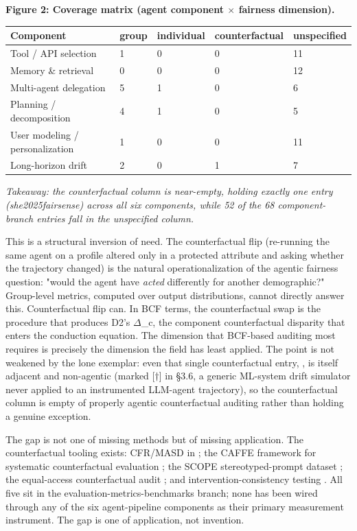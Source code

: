 \documentclass[10pt]{article}
\begin{document}
\textbf{Figure 2: Coverage matrix (agent component $\times$ fairness dimension).}

\begin{center}\footnotesize
\begin{longtable}{|p{}|p{}|p{}|p{}|p{}|}
\hline \textbf{Component} & \textbf{group} & \textbf{individual} & \textbf{counterfactual} & \textbf{unspecified} \\ \hline\endhead
Tool / API selection & 1 & 0 & 0 & 11 \\ \hline
Memory \& retrieval & 0 & 0 & 0 & 12 \\ \hline
Multi-agent delegation & 5 & 1 & 0 & 6 \\ \hline
Planning / decomposition & 4 & 1 & 0 & 5 \\ \hline
User modeling / personalization & 1 & 0 & 0 & 11 \\ \hline
Long-horizon drift & 2 & 0 & 1 & 7 \\ \hline
\end{longtable}\end{center}

\emph{Takeaway: the counterfactual column is near-empty, holding exactly one entry (she2025fairsense) across all six components, while 52 of the 68 component-branch entries fall in the unspecified column.}

This is a structural inversion of need. The counterfactual flip (re-running the same agent on a profile altered only in a protected attribute and asking whether the trajectory changed) is the natural operationalization of the agentic fairness question: "would the agent have \emph{acted} differently for another demographic?" Group-level metrics, computed over output distributions, cannot directly answer this. Counterfactual flip can. In BCF terms, the counterfactual swap is the procedure that produces D2's $\Delta$\_c, the component counterfactual disparity that enters the conduction equation. The dimension that BCF-based auditing most requires is precisely the dimension the field has least applied. The point is not weakened by the lone exemplar: even that single counterfactual entry, \cite{she2025fairsense}, is itself adjacent and non-agentic (marked [$\dagger$] in \S{}3.6, a generic ML-system drift simulator never applied to an instrumented LLM-agent trajectory), so the counterfactual column is empty of properly agentic counterfactual auditing rather than holding a genuine exception.

The gap is not one of missing methods but of missing application. The counterfactual tooling exists: CFR/MASD in \cite{mayilvaghanan2026counterfactual}; the CAFFE framework for systematic counterfactual evaluation \cite{parziale2025systematic}; the SCOPE stereotyped-prompt dataset \cite{parziale2026scope}; the equal-access counterfactual audit \cite{amirimargavi2026equal}; and intervention-consistency testing \cite{basu2026names}. All five sit in the evaluation-metrics-benchmarks branch; none has been wired through any of the six agent-pipeline components as their primary measurement instrument. The gap is one of application, not invention.
\end{document}
